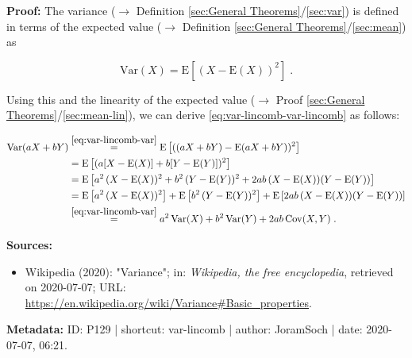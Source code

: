 \documentclass[a4paper,12pt,twoside]{book}
\begin{document}
\vspace{1em}
\textbf{Proof:} The variance ($\rightarrow$ Definition \ref{sec:General Theorems}/\ref{sec:var}) is defined in terms of the expected value ($\rightarrow$ Definition \ref{sec:General Theorems}/\ref{sec:mean}) as

\begin{equation} \label{eq:var-lincomb-var}
\mathrm{Var}(X) = \mathrm{E}\left[ (X-\mathrm{E}(X))^2 \right] \; .
\end{equation}

Using this and the linearity of the expected value ($\rightarrow$ Proof \ref{sec:General Theorems}/\ref{sec:mean-lin}), we can derive \eqref{eq:var-lincomb-var-lincomb} as follows:

\begin{equation} \label{eq:var-lincomb-var-lincomb-qed}
\begin{split}
\mathrm{Var}(aX+bY) &\overset{\eqref{eq:var-lincomb-var}}{=} \mathrm{E}\left[ ((aX+bY)-\mathrm{E}(aX+bY))^2 \right] \\
&= \mathrm{E}\left[ (a [X-\mathrm{E}(X)] + b [Y-\mathrm{E}(Y)])^2 \right] \\
&= \mathrm{E}\left[ a^2 \, (X-\mathrm{E}(X))^2 + b^2 \, (Y-\mathrm{E}(Y))^2 + 2ab \, (X-\mathrm{E}(X)) (Y-\mathrm{E}(Y)) \right] \\
&= \mathrm{E}\left[ a^2 \, (X-\mathrm{E}(X))^2 \right] + \mathrm{E}\left[ b^2 \, (Y-\mathrm{E}(Y))^2 \right] + \mathrm{E}\left[ 2ab \, (X-\mathrm{E}(X)) (Y-\mathrm{E}(Y)) \right] \\
&\overset{\eqref{eq:var-lincomb-var}}{=} a^2 \, \mathrm{Var}(X) + b^2 \, \mathrm{Var}(Y) + 2ab \, \mathrm{Cov}(X,Y) \; . \\
\end{split}
\end{equation}


\vspace{1em}
\textbf{Sources:}
\begin{itemize}
\item Wikipedia (2020): "Variance"; in: \textit{Wikipedia, the free encyclopedia}, retrieved on 2020-07-07; URL: \url{https://en.wikipedia.org/wiki/Variance#Basic_properties}.
\end{itemize}


\vspace{1em}
\textbf{Metadata:} ID: P129 | shortcut: var-lincomb | author: JoramSoch | date: 2020-07-07, 06:21.
\vspace{1em}
\end{document}
